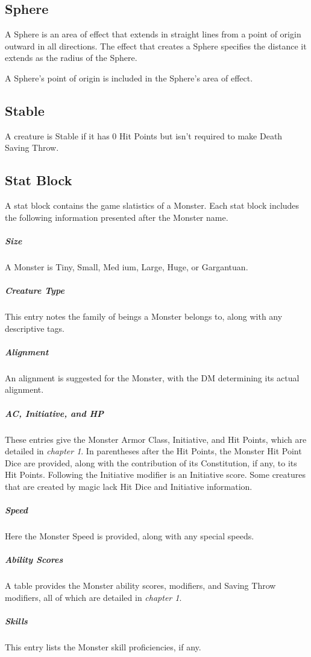 \documentclass[10pt,a4paper,twoside,bg=print,twocolumn,openany,nodeprecatedcode]{dndarticle}
\begin{document}
\subsection{Sphere}
A Sphere is an area of effect that extends in straight lines from a point of origin outward in all directions. The effect that creates a Sphere specifies the distance it extends as the radius of the Sphere.

A Sphere's point of origin is included in the Sphere's area of effect.

\subsection{Stable}
A creature is Stable if it has 0 Hit Points but isn't required to make Death Saving Throw.

\subsection{Stat Block}
A stat block contains the game slatistics of a Monster. Each stat block includes the following information presented after the Monster name.

\subparagraph{Size}
A Monster is Tiny, Small, Med ium, Large, Huge, or Gargantuan.

\subparagraph{Creature Type}
This entry notes the family of beings a Monster belongs to, along with any descriptive tags.

\subparagraph{Alignment}
An alignment is suggested for the Monster, with the DM determining its actual alignment.

\subparagraph{AC, Initiative, and HP}
These entries give the Monster Armor Class, Initiative, and Hit Points, which are detailed in \textit{chapter 1}. In parentheses after the Hit Points, the Monster Hit Point Dice are provided, along with the contribution of its Constitution, if any, to its Hit Points. Following the Initiative modifier is an Initiative score. Some creatures that are created by magic lack Hit Dice and Initiative information.

\subparagraph{Speed}
Here the Monster Speed is provided, along with any special speeds.

\subparagraph{Ability Scores}
A table provides the Monster ability scores, modifiers, and Saving Throw modifiers, all of which are detailed in \textit{chapter 1}.

\subparagraph{Skills}
This entry lists the Monster skill proficiencies, if any.
\end{document}
